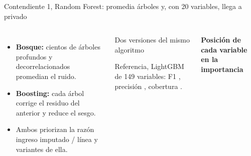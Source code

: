 \begin{frame}{Contendiente 1, Random Forest: promedia árboles y, con 20 variables, llega a \KgPrivMax{} privado}
  \begin{columns}[T]
    \small
    \begin{itemize}\setlength{\itemsep}{3pt}
      \item \textbf{Bosque:} cientos de árboles profundos y decorrelacionados promedian el ruido.
      \item \textbf{Boosting:} cada árbol corrige el residuo del anterior y reduce el sesgo.
      \item Ambos priorizan la razón ingreso imputado / línea y variantes de ella.
    \end{itemize}
    \vspace{1mm}
    \begin{block}{Dos versiones del mismo algoritmo}
      \footnotesize\centering
      \\[1mm]
      \raggedright Referencia, LightGBM de 149 variables: F1 \nSPBoostingLightGBM{}, precisión \nPrecLGBM{}, cobertura \nRecLGBM.
    \end{block}
    \centering\small\textbf{Posición de cada variable en la importancia}\\[2mm]
    \footnotesize
    \resizebox{\linewidth}{!}{}\\[2mm]
  \end{columns}
\end{frame}

